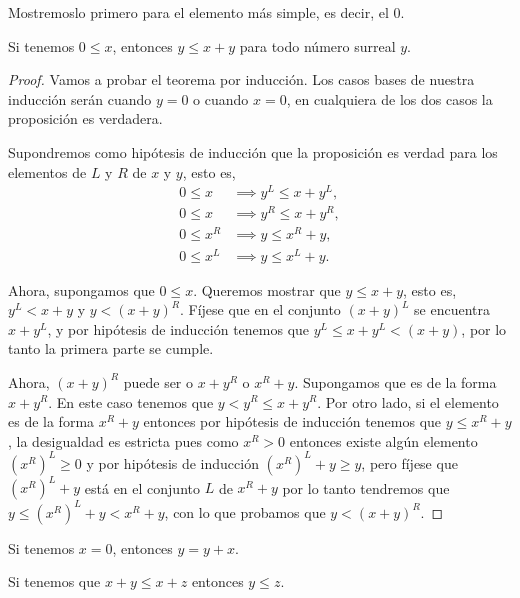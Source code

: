     Mostremoslo primero para el elemento m\'as simple, es decir, el $0$.

    \begin{theorem}
        Si tenemos $0 \le x$, entonces $y \le x + y$ para todo n\'umero surreal $y$.
    \end{theorem}

    \begin{proof}
        Vamos a probar el teorema por inducci\'on. Los casos bases de nuestra inducci\'on ser\'an cuando $y=0$ o cuando $x=0$, en cualquiera de los dos casos la proposici\'on es verdadera.

        Supondremos como hip\'otesis de inducci\'on que la proposici\'on es verdad para los elementos de $L$ y $R$ de $x$ y $y$, esto es,
        \begin{align*}
            0\le x & \implies y^L \le x + y^L, \\
            0\le x & \implies y^R \le x + y^R, \\
            0\le x^R & \implies y \le x^R + y, \\
            0\le x^L & \implies y \le x^L + y.
        \end{align*}

        Ahora, supongamos que $0\le x$. Queremos mostrar que $y \le x+y$, esto es, $y^L < x+y$ y $y < (x+y)^R$. F\'ijese que en el conjunto $(x+y)^L$ se encuentra $x+y^L$, y por hip\'otesis de inducci\'on tenemos que $y^L \le x+y^L < (x+y)$, por lo tanto la primera parte se cumple.
        
        Ahora, $(x+y)^R$ puede ser o $x+y^R$ o $x^R+y$. Supongamos que es de la forma $x+y^R$. En este caso tenemos que $y < y^R \le x+y^R$. Por otro lado, si el elemento es de la forma $x^R+y$ entonces por  hip\'otesis de inducci\'on tenemos que $y \le x^R+y$, la desigualdad es estricta pues como $x^R > 0$ entonces existe alg\'un elemento $(x^R)^L \ge 0$ y por hip\'otesis de inducci\'on $(x^R)^L + y \ge y$, pero f\'ijese que $(x^R)^L + y$ est\'a en el conjunto $L$ de $x^R+y$ por lo tanto tendremos que $y \le (x^R)^L + y < x^R+y$, con lo que probamos que $y < (x+y)^R$.
    \end{proof}

    \begin{corollary}
        \label{zero-sum}
        Si tenemos $x = 0$, entonces $y = y+x$.
    \end{corollary}

    \begin{theorem}
        Si tenemos que $x+y\le x+z$ entonces $y\le z$.
    \end{theorem}

